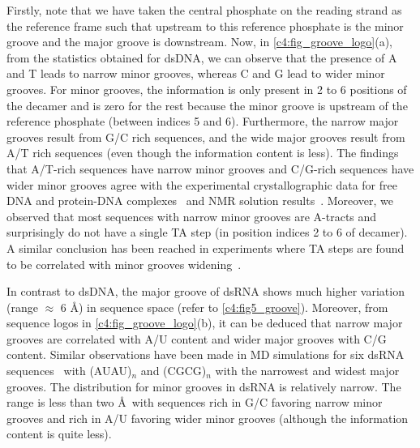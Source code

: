 Firstly, note that we have taken the central phosphate on the reading strand as the reference frame such that upstream to this reference phosphate is the minor groove and the major groove is downstream.
Now, in \cref{c4:fig_groove_logo}(a), from the statistics obtained for dsDNA, we can observe that the presence of A and T leads to narrow minor grooves, whereas C and G lead to wider minor grooves. 
For minor grooves, the information is only present in 2 to 6 positions of the decamer and is zero for the rest because the minor groove is upstream of the reference phosphate (between indices 5 and 6).
Furthermore, the narrow major grooves result from G/C rich sequences, and the wide major grooves result from A/T rich sequences (even though the information content is less). 
The findings that A/T-rich sequences have narrow minor grooves and C/G-rich sequences have wider minor grooves agree with the experimental crystallographic data for free DNA and protein-DNA complexes~\cite{rohs2010origins,oguey2010understanding} and NMR solution results~\cite{oguey2010understanding}.
Moreover, we observed that most sequences with narrow minor grooves are A-tracts and surprisingly do not have a single TA step (in position indices 2 to 6 of decamer).
A similar conclusion has been reached in experiments where TA steps are found to be correlated with minor grooves widening~\cite{rohs2010origins}.



In contrast to dsDNA, the major groove of dsRNA shows much higher variation (range $\approx$ 6 \AA) in sequence space (refer to \cref{c4:fig5_groove}).
Moreover, from sequence logos in \cref{c4:fig_groove_logo}(b), it can be deduced that narrow major grooves are correlated with A/U content and wider major grooves with C/G content. 
Similar observations have been made in MD simulations for six dsRNA sequences~\cite{marin2020double} with (AUAU)$_n$ and (CGCG)$_n$ with the narrowest and widest major grooves. 
The distribution for minor grooves in dsRNA is relatively narrow. 
The range is less than two \AA \ with sequences rich in G/C favoring narrow minor grooves and rich in A/U favoring wider minor grooves (although the information content is quite less).


